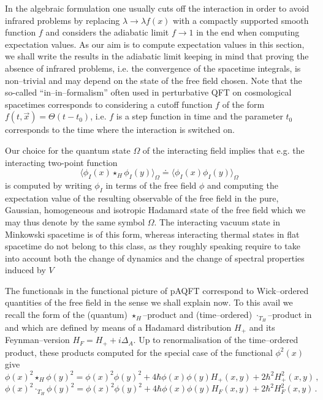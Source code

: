 \documentclass[10pt]{book}
\theoremstyle{break}
\begin{document}
In the algebraic formulation one usually cuts off the interaction in order to avoid infrared problems by replacing $\lambda\to \lambda f(x)$ with a compactly supported smooth function $f$ and considers the adiabatic limit $f\to 1$ in the end when computing expectation values. As our aim is to compute expectation values in this section, we shall write the results in the adiabatic limit keeping in mind that proving the absence of infrared problems, i.e. the convergence of the spacetime integrals, is non--trivial and may depend on the state of the free field chosen. Note that the so-called ``in--in--formalism'' often used in perturbative QFT on cosmological spacetimes corresponds to considering a cutoff function $f$ of the form $f(t,\vec{x}) = \Theta(t-t_0)$, i.e. $f$ is a step function in time and the parameter $t_0$ corresponds to the time where the interaction is switched on.


Our choice for the quantum state $\Omega$ of the interacting field implies that e.g. the interacting two-point function 
$$\langle \phi_I(x)\star_H\phi_I(y)\rangle_\Omega\doteq \langle \phi_I(x)\phi_I(y)\rangle_\Omega$$
is computed by writing $\phi_I$ in terms of the free field $\phi$ and computing the expectation value of the resulting observable of the free field in the pure, Gaussian, homogeneous and isotropic Hadamard state of the free field which we may thus denote by the same symbol $\Omega$. The interacting vacuum state in Minkowski spacetime is of this form, whereas interacting thermal states in flat spacetime do not belong to this class, as they roughly speaking require to take into account both the change of dynamics and the change of spectral properties induced by $V$ %

The functionals in the functional picture of pAQFT correspond to Wick--ordered quantities of the free field in the sense we shall explain now. To this avail we recall the form of the (quantum) $\star_H$--product and (time--ordered) $\cdot_{T_H}$--product in %
and %
which are defined by means of a Hadamard distribution $H_+$ and its Feynman--version $H_F = H_+ + i \Delta_A$. Up to renormalisation of the time--ordered product, these products computed for the special case of the functional $\phi^2(x)$ give
$$
\phi(x)^2\star_H \phi(y)^2=\phi(x)^2\phi(y)^2+4\hbar \phi(x)\phi(y) H_+(x,y)+2\hbar^2 H^2_+(x,y)\,,
$$
$$
\phi(x)^2\cdot_{T_H}\phi(y)^2=\phi(x)^2\phi(y)^2+4\hbar \phi(x)\phi(y) H_F(x,y)+2\hbar^2 H^2_F(x,y)\,.
$$
\end{document}
